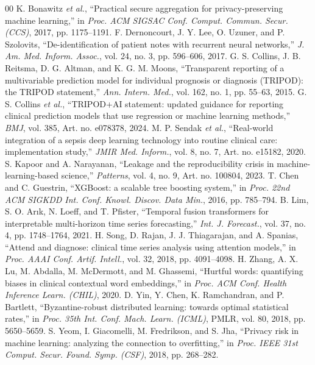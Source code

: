 \documentclass[conference]{IEEEtran}
\begin{document}
\begin{thebibliography}{00}
 K. Bonawitz \textit{et al.}, ``Practical secure aggregation for privacy-preserving machine learning,'' in \textit{Proc. ACM SIGSAC Conf. Comput. Commun. Secur. (CCS)}, 2017, pp. 1175--1191.
 F. Dernoncourt, J. Y. Lee, O. Uzuner, and P. Szolovits, ``De-identification of patient notes with recurrent neural networks,'' \textit{J. Am. Med. Inform. Assoc.}, vol. 24, no. 3, pp. 596--606, 2017.
 G. S. Collins, J. B. Reitsma, D. G. Altman, and K. G. M. Moons, ``Transparent reporting of a multivariable prediction model for individual prognosis or diagnosis (TRIPOD): the TRIPOD statement,'' \textit{Ann. Intern. Med.}, vol. 162, no. 1, pp. 55--63, 2015.
 G. S. Collins \textit{et al.}, ``TRIPOD+AI statement: updated guidance for reporting clinical prediction models that use regression or machine learning methods,'' \textit{BMJ}, vol. 385, Art. no. e078378, 2024.
 M. P. Sendak \textit{et al.}, ``Real-world integration of a sepsis deep learning technology into routine clinical care: implementation study,'' \textit{JMIR Med. Inform.}, vol. 8, no. 7, Art. no. e15182, 2020.
 S. Kapoor and A. Narayanan, ``Leakage and the reproducibility crisis in machine-learning-based science,'' \textit{Patterns}, vol. 4, no. 9, Art. no. 100804, 2023.
 T. Chen and C. Guestrin, ``XGBoost: a scalable tree boosting system,'' in \textit{Proc. 22nd ACM SIGKDD Int. Conf. Knowl. Discov. Data Min.}, 2016, pp. 785--794.
 B. Lim, S. O. Ar{\i}k, N. Loeff, and T. Pfister, ``Temporal fusion transformers for interpretable multi-horizon time series forecasting,'' \textit{Int. J. Forecast.}, vol. 37, no. 4, pp. 1748--1764, 2021.
 H. Song, D. Rajan, J. J. Thiagarajan, and A. Spanias, ``Attend and diagnose: clinical time series analysis using attention models,'' in \textit{Proc. AAAI Conf. Artif. Intell.}, vol. 32, 2018, pp. 4091--4098.
 H. Zhang, A. X. Lu, M. Abdalla, M. McDermott, and M. Ghassemi, ``Hurtful words: quantifying biases in clinical contextual word embeddings,'' in \textit{Proc. ACM Conf. Health Inference Learn. (CHIL)}, 2020.
 D. Yin, Y. Chen, K. Ramchandran, and P. Bartlett, ``Byzantine-robust distributed learning: towards optimal statistical rates,'' in \textit{Proc. 35th Int. Conf. Mach. Learn. (ICML)}, PMLR, vol. 80, 2018, pp. 5650--5659.
 S. Yeom, I. Giacomelli, M. Fredrikson, and S. Jha, ``Privacy risk in machine learning: analyzing the connection to overfitting,'' in \textit{Proc. IEEE 31st Comput. Secur. Found. Symp. (CSF)}, 2018, pp. 268--282.

\end{thebibliography}
\end{document}
